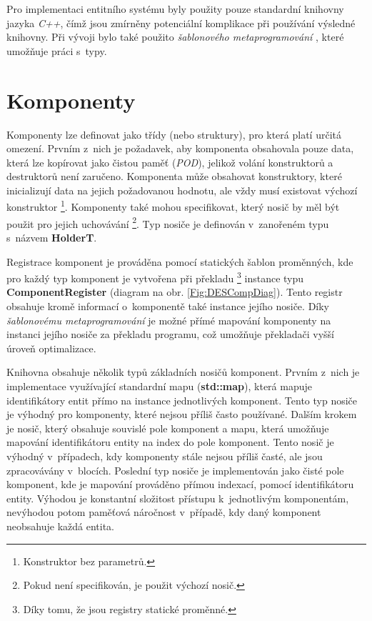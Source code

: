 Pro implementaci entitního systému byly použity pouze standardní knihovny jazyka \emph{C++}, čímž jsou zmírněny potenciální komplikace při používání výsledné knihovny. Při vývoji bylo také použito \emph{šablonového metaprogramování} \cite{CppMetaprogramming}, které umožňuje práci s~typy.

\section{Komponenty}

Komponenty lze definovat jako třídy (nebo struktury), pro která platí určitá omezení. Prvním z~nich je požadavek, aby komponenta obsahovala pouze data, která lze kopírovat jako čistou paměť (\emph{POD}), jelikož volání konstruktorů a destruktorů není zaručeno. Komponenta může obsahovat konstruktory, které inicializují data na jejich požadovanou hodnotu, ale vždy musí existovat výchozí konstruktor \footnote{Konstruktor bez parametrů.}. Komponenty také mohou specifikovat, který nosič by měl být použit pro jejich uchovávání \footnote{Pokud není specifikován, je použit výchozí nosič.}. Typ nosiče je definován v~zanořeném typu s~názvem \textbf{HolderT}.

Registrace komponent je prováděna pomocí statických šablon proměnných, kde pro každý typ komponent je vytvořena při překladu \footnote{Díky tomu, že jsou registry statické proměnné.} instance typu \textbf{ComponentRegister} (diagram na obr. \ref{Fig:DESCompDiag}). Tento registr obsahuje kromě informací o~komponentě také instance jejího nosiče. Díky \emph{šablonovému metaprogramování} je možné přímé mapování komponenty na instanci jejího nosiče za překladu programu, což umožňuje překladači vyšší úroveň optimalizace.

Knihovna obsahuje několik typů základních nosičů komponent. Prvním z~nich je implementace využívající standardní mapu (\textbf{std::map}), která mapuje identifikátory entit přímo na instance jednotlivých komponent. Tento typ nosiče je výhodný pro komponenty, které nejsou příliš často používané. Dalším krokem je nosič, který obsahuje souvislé pole komponent a mapu, která umožňuje mapování identifikátoru entity na index do pole komponent. Tento nosič je výhodný v~případech, kdy komponenty stále nejsou příliš časté, ale jsou zpracovávány v~blocích. Poslední typ nosiče je implementován jako čisté pole komponent, kde je mapování prováděno přímou indexací, pomocí identifikátoru entity. Výhodou je konstantní složitost přístupu k~jednotlivým komponentám, nevýhodou potom paměťová náročnost v~případě, kdy daný komponent neobsahuje každá entita. 


